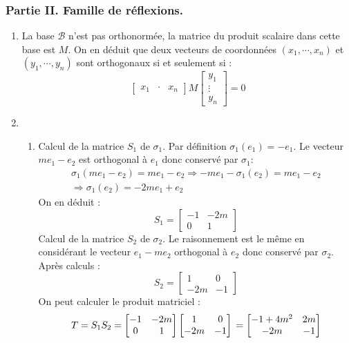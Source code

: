 \subsubsection*{Partie II. Famille de réflexions.}
\begin{enumerate}
 \item La base $\mathcal B$ n'est pas orthonormée, la matrice du produit scalaire dans cette base est $M$. On en déduit que deux vecteurs de coordonnées $(x_1,\cdots,x_n)$ et $(y_1,\cdots,y_n)$ sont orthogonaux si et seulement si :
\begin{displaymath}
 \begin{bmatrix}
  x_1 & \cdot & x_n
 \end{bmatrix}
M
\begin{bmatrix}
 y_1 \\ \vdots \\ y_n
\end{bmatrix}
=0
\end{displaymath}


 \item \begin{enumerate}
 \item Calcul de la matrice $S_1$ de $\sigma_1$. Par définition $\sigma_1(e_1)=-e_1$. Le vecteur $me_1-e_2$ est orthogonal à $e_1$ donc conservé par $\sigma_1$:
\begin{multline*}
 \sigma_1(me_1-e_2)=me_1-e_2 \Rightarrow -me_1 -\sigma_1(e_2)=me_1-e_2 \\
\Rightarrow \sigma_1(e_2) = -2me_1+e_2
\end{multline*}
 On en déduit :
\begin{displaymath}
 S_1=
\begin{bmatrix}
 -1 & -2m \\
0 & 1
\end{bmatrix}
\end{displaymath}
Calcul de la matrice $S_2$ de $\sigma_2$. Le raisonnement est le même en considérant le vecteur $e_1-me_2$ orthogonal à $e_2$ donc conservé par $\sigma_2$. Après calculs :
\begin{displaymath}
 S_2 =
\begin{bmatrix}
 1 & 0 \\
-2m & -1
\end{bmatrix}
\end{displaymath}
On peut calculer le produit matriciel :
\begin{displaymath}
 T =S_1S_2 =
\begin{bmatrix}
 -1 & -2m \\
0 & 1
\end{bmatrix}
\begin{bmatrix}
 1 & 0 \\
-2m & -1
\end{bmatrix}
\\
=
\begin{bmatrix}
 -1+4m^2 & 2m \\
-2m & -1
\end{bmatrix}
\end{displaymath}


\end{enumerate}
\end{enumerate}

